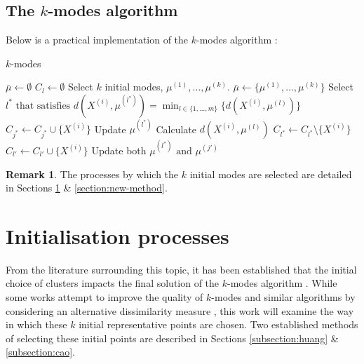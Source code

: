 \documentclass{article}
\theoremstyle{definition}
\newtheorem*{remark}{Remark}
\begin{document}
\subsection{The $k$-modes algorithm}\label{subsection:kmodes}

Below is a practical implementation of the $k$-modes algorithm \cite{Huang98}:

\begin{algorithm}[H]
\caption{$k$-modes}\label{alg:kmodes}
	\begin{algorithmic}[0] 
		\State $\bar{\mu} \gets \emptyset$
			\State $C_l \gets \emptyset$
		\EndFor
		\State Select $k$ initial modes, $\mu^{(1)}, \ldots, \mu^{(k)}$.
		\State $\bar{\mu} \gets \{\mu^{(1)}, \ldots, \mu^{(k)}\}$
			\State Select $l^* \text{ that satisfies } d(X^{(i)}, \mu^{(l^*)}) = \min_{l \in \{1, \ldots, m\}} \{d(X^{(i)}, \mu^{(l)})\}$
			\State $C_{j^*} \gets C_{j^*} \cup \{X^{(i)}\}$
			\State Update $\mu^{(l^*)}$
		\EndFor
		\Repeat
					\State Calculate $d(X^{(i)}, \mu^{(l)})$
				\EndFor
					\State $C_{l^*} \gets C_{l^*} \setminus \{X^{(i)}\}$
					\State $C_{l'} \gets C_{l'} \cup \{X^{(i)}\}$
					\State Update both $\mu^{(l^*)} \text{ and } \mu^{(j')}$
				\EndIf
			\EndFor
	\end{algorithmic}
\end{algorithm}

\begin{remark}
The processes by which the $k$ initial modes are selected are detailed in Sections \ref{section:init} \& \ref{section:new-method}.
\end{remark}



\section{Initialisation processes}\label{section:init}

From the literature surrounding this topic, it has been established that the initial choice of clusters impacts the final solution of the $k$-modes algorithm \cite{Huang98}\cite{Cao09}. While some works attempt to improve the quality of $k$-modes and similar algorithms by considering an alternative dissimilarity measure \cite{Ng07}, this work will examine the way in which these $k$ initial representative points are chosen. Two established methods of selecting these initial points are described in Sections \ref{subsection:huang} \& \ref{subsection:cao}.
\end{document}
